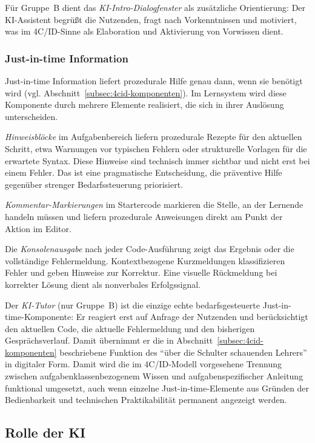Für Gruppe~B dient das \textit{KI-Intro-Dialogfenster} als zusätzliche Orientierung: Der KI-Assistent begrüßt die Nutzenden, fragt nach Vorkenntnissen und motiviert, was im 4C/ID-Sinne als Elaboration und Aktivierung von Vorwissen dient.

\subsubsection{Just-in-time Information}

Just-in-time Information liefert prozedurale Hilfe genau dann, wenn sie benötigt wird (vgl. Abschnitt~\ref{subsec:4cid-komponenten}).
Im Lernsystem wird diese Komponente durch mehrere Elemente realisiert, die sich in ihrer Auslösung unterscheiden.

\textit{Hinweisblöcke} im Aufgabenbereich liefern prozedurale Rezepte für den aktuellen Schritt, etwa Warnungen vor typischen Fehlern oder strukturelle Vorlagen für die erwartete Syntax.
Diese Hinweise sind technisch immer sichtbar und nicht erst bei einem Fehler. Das ist eine pragmatische Entscheidung, die präventive Hilfe gegenüber strenger Bedarfssteuerung priorisiert.

\textit{Kommentar-Markierungen} im Startercode markieren die Stelle, an der Lernende handeln müs\-sen und liefern prozedurale Anweisungen direkt am Punkt der Aktion im Editor.

Die \textit{Konsolenausgabe} nach jeder Code-Ausführung zeigt das Ergebnis oder die vollständige Fehlermeldung.
Kontextbezogene Kurzmeldungen klassifizieren Fehler und geben Hinweise zur Korrektur.
Eine visuelle Rückmeldung bei korrekter Lösung dient als nonverbales Erfolgssignal.

Der \textit{KI-Tutor} (nur Gruppe~B) ist die einzige echte bedarfsgesteuerte Just-in-time-Komponente: Er reagiert erst auf Anfrage der Nutzenden und berücksichtigt den aktuellen Code, die aktuelle Fehlermeldung und den bisherigen Gesprächsverlauf.
Damit übernimmt er die in Abschnitt~\ref{subsec:4cid-komponenten} beschriebene Funktion des \enquote{über die Schulter schauenden Lehrers} in digitaler Form.
Damit wird die im 4C/ID-Modell vorgesehene Trennung zwischen aufgabenklassenbezogenem Wissen und aufgabenspezifischer Anleitung funktional umgesetzt, auch wenn einzelne Just-in-time-Elemente aus Gründen der Bedienbarkeit und technischen Praktikabilität permanent angezeigt werden.


\subsection{Rolle der KI}\label{subsec:ki-rolle}

